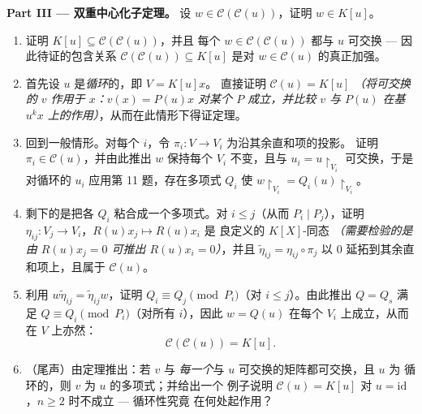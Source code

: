 \begin{problem}
\medskip
\noindent\textbf{Part III --- 双重中心化子定理。}
设 $w \in \mathcal C(\mathcal C(u))$，证明 $w \in K[u]$。
\begin{enumerate}[resume]
  \item 证明 $K[u] \subseteq \mathcal C(\mathcal C(u))$，并且
        每个 $w \in \mathcal C(\mathcal C(u))$ 都与 $u$ 可交换
        --- 因此待证的包含关系
        $\mathcal C(\mathcal C(u)) \subseteq K[u]$ 是对
        $w \in \mathcal C(u)$ 的真正加强。
  \item 首先设 $u$ 是\emph{循环}的，即 $V = K[u]x$。
        直接证明 $\mathcal C(u) = K[u]$
        \emph{（将可交换的 $v$ 作用于 $x$：$v(x) = P(u)x$
        对某个 $P$ 成立，并比较 $v$ 与 $P(u)$
        在基 $u^k x$ 上的作用）}，从而在此情形下得证定理。
  \item 回到一般情形。对每个 $i$，令 $\pi_i\colon
        V \to V_i$ 为沿其余直和项的投影。
        证明 $\pi_i \in \mathcal C(u)$，并由此推出 $w$
        保持每个 $V_i$ 不变，且与 $u_i =
        u\restriction_{V_i}$ 可交换，于是
        对循环的 $u_i$ 应用第 11 题，存在多项式 $Q_i$ 使
        $w\restriction_{V_i} = Q_i(u)\restriction_{V_i}$。
  \item 剩下的是把各 $Q_i$ 粘合成一个多项式。对 $i
        \leq j$（从而 $P_i \mid P_j$），证明 $\eta_{ij} \colon
        V_j \to V_i$，$R(u)x_j \mapsto R(u)x_i$ 是
        良定义的 $K[X]$-同态 \emph{（需要检验的是
        由 $R(u)x_j = 0$ 可推出 $R(u)x_i = 0$）}，并且
        $\tilde\eta_{ij} = \eta_{ij}\circ\pi_j$ 以 $0$
        延拓到其余直和项上，且属于 $\mathcal C(u)$。
  \item 利用 $w\tilde\eta_{ij} = \tilde\eta_{ij}w$，证明 $Q_i
        \equiv Q_j \pmod{P_i}$（对 $i \leq j$）。由此推出 $Q =
        Q_s$
        满足 $Q \equiv Q_i \pmod {P_i}$（对所有 $i$），因此
        $w = Q(u)$ 在每个 $V_i$ 上成立，从而在 $V$ 上亦然：
        \[
        \boxed{\ \mathcal C(\mathcal C(u)) = K[u].\ }
        \]
  \item （尾声）由定理推出：若 $v$ 与
        \emph{每一个}与 $u$ 可交换的矩阵都可交换，且 $u$ 为
        循环的，则 $v$ 为 $u$ 的多项式；并给出一个
        例子说明 $\mathcal C(u) = K[u]$ 对 $u =
        \mathrm{id}$，$n \geq 2$ 时不成立 --- 循环性究竟
        在何处起作用？
\end{enumerate}


\end{problem}
